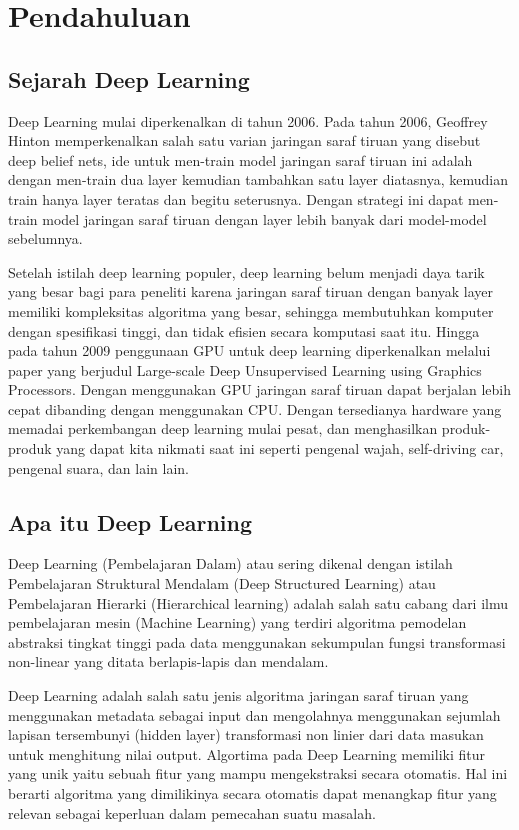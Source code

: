 \section{Pendahuluan}
\subsection{Sejarah Deep Learning}
Deep Learning mulai diperkenalkan di tahun 2006. Pada tahun 2006, Geoffrey Hinton memperkenalkan salah satu varian jaringan saraf tiruan yang disebut deep belief nets, ide untuk men-train model jaringan saraf tiruan ini adalah dengan men-train dua layer kemudian tambahkan satu layer diatasnya, kemudian train hanya layer teratas dan begitu seterusnya. Dengan strategi ini dapat men-train model jaringan saraf tiruan dengan layer lebih banyak dari model-model sebelumnya. 

Setelah istilah deep learning populer, deep learning belum menjadi daya tarik yang besar bagi para peneliti karena jaringan saraf tiruan dengan banyak layer memiliki kompleksitas algoritma yang besar, sehingga membutuhkan komputer dengan spesifikasi tinggi, dan tidak efisien secara komputasi saat itu. Hingga pada tahun 2009 penggunaan GPU untuk deep learning diperkenalkan melalui paper yang berjudul Large-scale Deep Unsupervised Learning using Graphics Processors. Dengan menggunakan GPU jaringan saraf tiruan dapat berjalan lebih cepat dibanding dengan menggunakan CPU. Dengan tersedianya hardware yang memadai perkembangan deep learning mulai pesat, dan menghasilkan produk-produk yang dapat kita nikmati saat ini seperti pengenal wajah, self-driving car, pengenal suara, dan lain lain.

\subsection{Apa itu Deep Learning}
Deep Learning (Pembelajaran Dalam) atau sering dikenal dengan istilah Pembelajaran Struktural Mendalam (Deep Structured Learning) atau Pembelajaran Hierarki (Hierarchical learning) adalah salah satu cabang dari ilmu pembelajaran mesin (Machine Learning) yang terdiri algoritma pemodelan abstraksi tingkat tinggi pada data menggunakan sekumpulan fungsi transformasi non-linear yang ditata berlapis-lapis dan mendalam.

Deep Learning adalah salah satu jenis algoritma jaringan saraf tiruan yang menggunakan metadata sebagai input dan mengolahnya menggunakan sejumlah lapisan tersembunyi (hidden layer) transformasi non linier dari data masukan untuk menghitung nilai output. Algortima pada Deep Learning memiliki fitur yang unik yaitu sebuah fitur yang mampu mengekstraksi secara otomatis. Hal ini berarti algoritma yang dimilikinya secara otomatis dapat menangkap fitur yang relevan sebagai keperluan dalam pemecahan suatu masalah.
